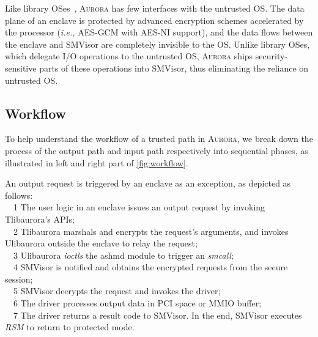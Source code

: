 \documentclass[journal,twocolumn,letterpaper,10pt]{IEEEtran}
\begin{document}
Like library OSes~\cite{DBLP:journals/tocs/BaumannPH15, DBLP:conf/usenix/TsaiPV17, shinde_panoply:_2017}, \textsc{Aurora} has few interfaces with the untrusted OS. %
The data plane of an enclave is protected by advanced encryption schemes accelerated by the processor (\emph{i.e.,} AES-GCM with AES-NI support), and the data flows between the enclave and SMVisor are completely invisible to the OS. Unlike library OSes, which delegate I/O operations to the untrusted OS, \textsc{Aurora} ships security-sensitive parts of these operations into SMVisor, thus eliminating the reliance on untrusted OS.

\iffalse

\subsection{Workflow}\label{workflow}

To help understand the workflow of a trusted path in \textsc{Aurora}, we break down the process of the output path and input path respectively into sequential phases, as illustrated in left and right part of \autoref{fig:workflow}.

An output request is triggered by an enclave as an exception, as depicted as follows:\\
~~\textcircled{\footnotesize{1}} The user logic in an enclave issues an output request by invoking  Tlibaurora's APIs;\\
~~\textcircled{\footnotesize{2}} Tlibaurora marshals and encrypts the request's arguments, and invokes Ulibaurora outside the enclave to relay the request;\\ %
~~\textcircled{\footnotesize{3}} Ulibaurora \emph{ioctls} the ashmd module to trigger an \textit{smcall};\\
~~\textcircled{\footnotesize{4}} SMVisor is notified and obtains the encrypted requests from the secure session;\\
~~\textcircled{\footnotesize{5}} SMVisor decrypts the request and invokes the driver;\\
~~\textcircled{\footnotesize{6}} The driver processes output data in PCI space or MMIO buffer;\\
~~\textcircled{\footnotesize{7}} The driver returns a result code to SMVisor. In the end, SMVisor executes \textit{RSM} to return to protected mode. \\
\end{document}
